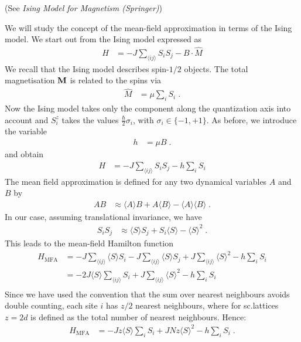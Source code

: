 (See {\em Ising Model for Magnetism (Springer)})

We will study the concept of the mean-field approximation in terms of the Ising model. 
We start out from  the Ising model expressed as
%
\begin{align*}
H &= - J \sum_{\langle ij\rangle} S_{i}S_{j} - 
B \cdot \hat M
\end{align*}
%
We recall that the Ising model describes spin-$1/2$ objects. 
The total magnetisation $\mathbf M$ is related to the spins
via 
%
\begin{align*}
\hat  M &=  \mu \sum_{i}
S_{i}\;.
\end{align*}
%
Now the Ising model takes only the component along the quantization axis into account and $S_{i}^{z}$ takes the values $\frac{\hbar}{2} \sigma_{i}$, with 
	$\sigma_{i}\in \{-1,+1\}$. 
%
As before, we introduce the  variable
%
\begin{align*}
h &= \mu  B\;.
\end{align*}
%
and obtain
\begin{align*}
H &= -J \sum_{\langle ij\rangle} S_{i}S_{j} - 
h \sum_{i} S_{i}
\end{align*}
The mean field approximation is defined for any two dynamical variables $A$ and $B$
by
%
\begin{align*}
A B &\approx \langle A  \rangle B + A \langle B \rangle
-\langle A \rangle\langle B  \rangle\;.
\end{align*}
%
In our case, assuming translational invariance, we have
\begin{align*}
S_{i} S_{j}&\approx \langle S \rangle S_{j} + S_{i} \langle S \rangle
-\langle S \rangle^{2}\;.
\end{align*}
This leads to  the mean-field Hamilton function
%
\begin{align*}
H_\text{MFA} &= - J  \sum_{\langle ij\rangle}  \langle S \rangle S_{i}
- J  \sum_{\langle ij\rangle}  \langle S \rangle S_{j}
+J \sum_{\langle ij\rangle}  \langle S \rangle^{2}
  - h
\sum_{i} S_{i} \\
&= - 2J    \langle S \rangle \sum_{\langle ij\rangle} S_{i}
+J \sum_{\langle ij\rangle}  \langle S \rangle^{2}
  - h \sum_{i} S_{i} \\
\end{align*}
%
Since we have used the convention that the sum over nearest neighbours avoids
double counting, each site $i$ has $z/2$ nearest neighbours, where for sc.lattices $z=2d$ is defined as the total number of nearest neighbours.
Hence:
%
\begin{align*}
H_\text{MFA} 
&= - J z  \langle S \rangle \sum_{i}  S_{i}
+ J N z  \langle S \rangle^{2}
  - h
\sum_{i} S_{i} \;.
\end{align*}
